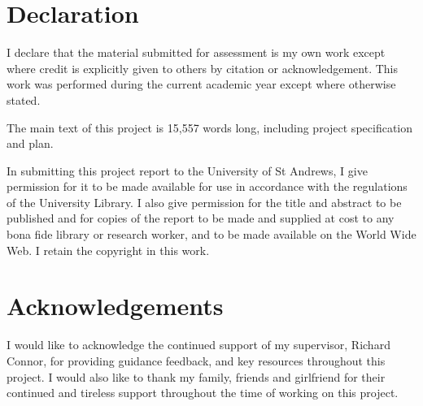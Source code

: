 \documentclass[a4paper,11pt]{article}
\begin{document}
\newpage
{}
\section{Declaration}
I declare that the material submitted for assessment is my own work except where credit is explicitly given to others by citation or acknowledgement. This work was performed during the current academic year except where otherwise stated.

The main text of this project is 15,557 words long, including project specification and plan.

In submitting this project report to the University of St Andrews, I give permission for it to be made available for use in accordance with the regulations of the University Library. I also give permission for the title and abstract to be published and for copies of the report to be made and supplied at cost to any bona fide library or research worker, and to be made available on the World Wide Web. I retain the copyright in this work.

\vspace{7cm}

\section{Acknowledgements}
I would like to acknowledge the continued support of my supervisor, Richard Connor, for providing guidance feedback, and key resources throughout this project. I would also like to thank my family, friends and girlfriend for their continued and tireless support throughout the time of working on this project. 

\newpage

\renewcommand{\baselinestretch}{0.75}
\tableofcontents

\clearpage
{}

\setlength{\parskip}{0.75em}
\setlength{\parindent}{0em}

\onehalfspacing
\end{document}
